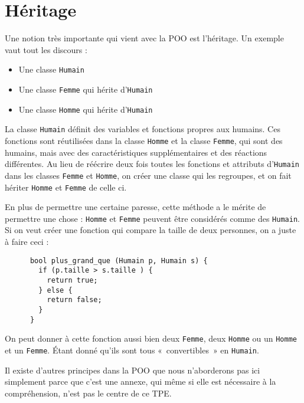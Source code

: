   \section{Héritage}
    Une notion très importante qui vient avec la POO est l'héritage. Un exemple vaut tout les discours :
      \begin{itemize}
        \item Une classe \texttt{Humain}
        \item Une classe \texttt{Femme} qui hérite d'\texttt{Humain}
        \item Une classe \texttt{Homme} qui hérite d'\texttt{Humain}
      \end{itemize}
    
    La classe \texttt{Humain} définit des variables et fonctions propres aux humains. Ces fonctions sont réutilisées dans la classe \texttt{Homme} et la classe \texttt{Femme}, qui sont des humains, mais avec des caractéristiques supplémentaires et des réactions différentes. Au lieu de réécrire deux fois toutes les fonctions et attributs d'\texttt{Humain} dans les classes \texttt{Femme} et \texttt{Homme}, on créer une classe qui les regroupes, et on fait hériter \texttt{Homme} et \texttt{Femme} de celle ci.
    
    En plus de permettre une certaine paresse, cette méthode a le mérite de permettre une chose : \texttt{Homme} et \texttt{Femme} peuvent être considérés comme des \texttt{Humain}. Si on veut créer une fonction qui compare la taille de deux 
    personnes, on a juste à faire ceci :
    \begin{lstlisting}
      bool plus_grand_que (Humain p, Humain s) {
        if (p.taille > s.taille ) {
          return true;
        } else {
          return false;
        }
      }
    \end{lstlisting}
    
    On peut donner à cette fonction aussi bien deux \texttt{Femme}, deux \texttt{Homme} ou un \texttt{Homme} et un \texttt{Femme}. Étant donné qu'ils sont tous «~convertibles~» en \texttt{Humain}.
    
    Il existe d'autres principes dans la POO que nous n'aborderons pas ici simplement parce que c'est une annexe, qui même si elle est nécessaire à la compréhension, n'est pas le centre de ce TPE.

